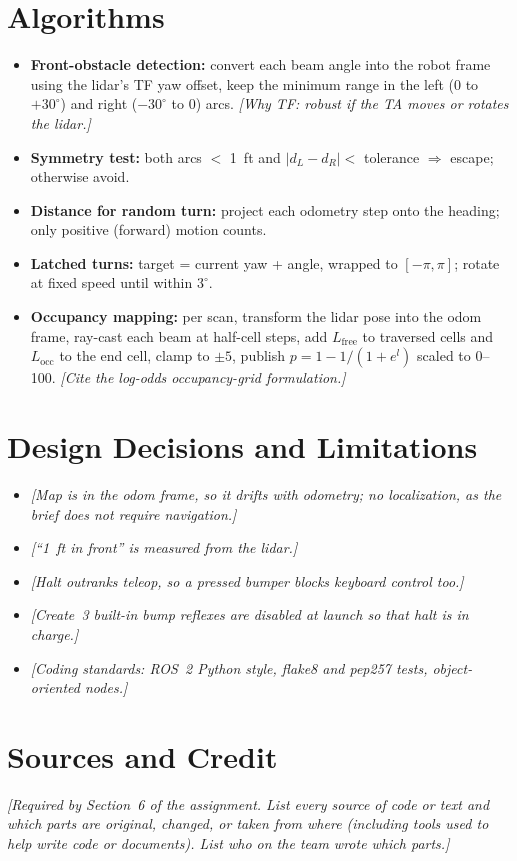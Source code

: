 \documentclass[11pt]{article}
\newcommand{\prompt}[1]{\textit{[#1]}}
\begin{document}
\section{Algorithms}
\begin{itemize}
  \item \textbf{Front-obstacle detection:} convert each beam angle into the
        robot frame using the lidar's TF yaw offset, keep the minimum range
        in the left ($0$ to $+30^\circ$) and right ($-30^\circ$ to $0$)
        arcs. \prompt{Why TF: robust if the TA moves or rotates the lidar.}
  \item \textbf{Symmetry test:} both arcs $<$ 1~ft and
        $|d_L - d_R| <$ tolerance $\Rightarrow$ escape; otherwise avoid.
  \item \textbf{Distance for random turn:} project each odometry step onto
        the heading; only positive (forward) motion counts.
  \item \textbf{Latched turns:} target = current yaw + angle, wrapped to
        $[-\pi,\pi]$; rotate at fixed speed until within $3^\circ$.
  \item \textbf{Occupancy mapping:} per scan, transform the lidar pose into
        the odom frame, ray-cast each beam at half-cell steps, add
        $L_{\text{free}}$ to traversed cells and $L_{\text{occ}}$ to the end
        cell, clamp to $\pm5$, publish $p = 1 - 1/(1+e^{l})$ scaled to
        0--100. \prompt{Cite the log-odds occupancy-grid formulation.}
\end{itemize}

\section{Design Decisions and Limitations}
\begin{itemize}
  \item \prompt{Map is in the odom frame, so it drifts with odometry; no
        localization, as the brief does not require navigation.}
  \item \prompt{``1~ft in front'' is measured from the lidar.}
  \item \prompt{Halt outranks teleop, so a pressed bumper blocks keyboard
        control too.}
  \item \prompt{Create~3 built-in bump reflexes are disabled at launch so
        that halt is in charge.}
  \item \prompt{Coding standards: ROS~2 Python style, flake8 and pep257
        tests, object-oriented nodes.}
\end{itemize}

\section{Sources and Credit}
\prompt{Required by Section~6 of the assignment. List every source of code
or text and which parts are original, changed, or taken from where
(including tools used to help write code or documents). List who on the
team wrote which parts.}
\end{document}
